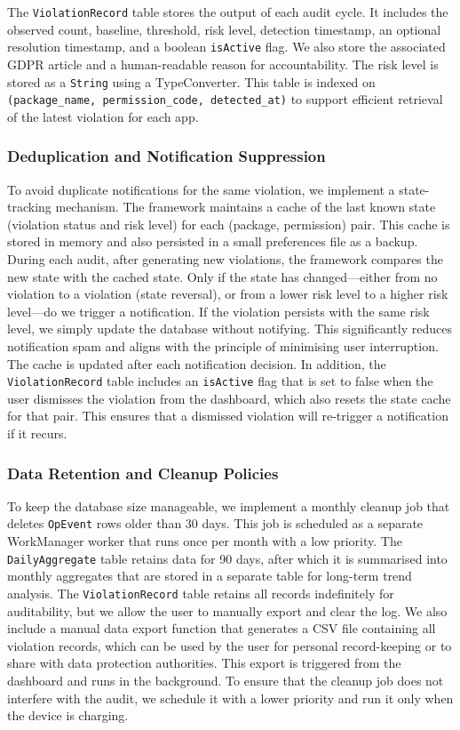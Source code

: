 The \texttt{ViolationRecord} table stores the output of each audit cycle. It includes the observed count, baseline, threshold, risk level, detection timestamp, an optional resolution timestamp, and a boolean \texttt{isActive} flag. We also store the associated GDPR article and a human-readable reason for accountability. The risk level is stored as a \texttt{String} using a TypeConverter. This table is indexed on \texttt{(package\_name, permission\_code, detected\_at)} to support efficient retrieval of the latest violation for each app.

\subsubsection{Deduplication and Notification Suppression}

To avoid duplicate notifications for the same violation, we implement a state-tracking mechanism. The framework maintains a cache of the last known state (violation status and risk level) for each (package, permission) pair. This cache is stored in memory and also persisted in a small preferences file as a backup. During each audit, after generating new violations, the framework compares the new state with the cached state. Only if the state has changed—either from no violation to a violation (state reversal), or from a lower risk level to a higher risk level—do we trigger a notification. If the violation persists with the same risk level, we simply update the database without notifying. This significantly reduces notification spam and aligns with the principle of minimising user interruption. The cache is updated after each notification decision. In addition, the \texttt{ViolationRecord} table includes an \texttt{isActive} flag that is set to false when the user dismisses the violation from the dashboard, which also resets the state cache for that pair. This ensures that a dismissed violation will re-trigger a notification if it recurs.

\subsubsection{Data Retention and Cleanup Policies}

To keep the database size manageable, we implement a monthly cleanup job that deletes \texttt{OpEvent} rows older than 30 days. This job is scheduled as a separate WorkManager worker that runs once per month with a low priority. The \texttt{DailyAggregate} table retains data for 90 days, after which it is summarised into monthly aggregates that are stored in a separate table for long-term trend analysis. The \texttt{ViolationRecord} table retains all records indefinitely for auditability, but we allow the user to manually export and clear the log. We also include a manual data export function that generates a CSV file containing all violation records, which can be used by the user for personal record-keeping or to share with data protection authorities. This export is triggered from the dashboard and runs in the background. To ensure that the cleanup job does not interfere with the audit, we schedule it with a lower priority and run it only when the device is charging.

